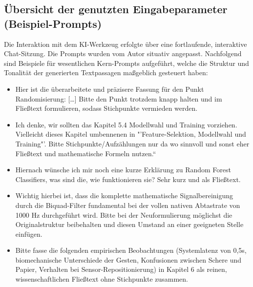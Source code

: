 \subsection*{Übersicht der genutzten Eingabeparameter (Beispiel-Prompts)}
Die Interaktion mit dem KI-Werkzeug erfolgte über eine fortlaufende, interaktive Chat-Sitzung. Die Prompts wurden vom Autor situativ angepasst. Nachfolgend sind Beispiele für wesentlichen Kern-Prompts aufgeführt, welche die Struktur und Tonalität der generierten Textpassagen maßgeblich gesteuert haben:
\begin{itemize}
    \item Hier ist die überarbeitete und präzisere Fassung für den Punkt Randomisierung: [\dots] Bitte den Punkt trotzdem knapp halten und im Fließtext formulieren, sodass Stichpunkte vermieden werden.
    \item Ich denke, wir sollten das Kapitel 5.4 Modellwahl und Training vorziehen. Vielleicht dieses Kapitel umbennenen in "'Feature-Selektion, Modellwahl und Training"'. Bitte Stichpunkte/Aufzählungen nur da wo sinnvoll und sonst eher Fließtext und mathematische Formeln nutzen.“
    \item Hiernach wünsche ich mir noch eine kurze Erklärung zu Random Forest Classifiers, was sind die, wie funktionieren sie? Sehr kurz und als Fließtext.
    \item Wichtig hierbei ist, dass die komplette mathematische Signalbereinigung durch die Biquad-Filter fundamental bei der vollen nativen Abtastrate von 1000 Hz durchgeführt wird. Bitte bei der Neuformulierung möglichst die Originalstruktur beibehalten und diesen Umstand an einer geeigneten Stelle einfügen.
    \item Bitte fasse die folgenden empirischen Beobachtungen (Systemlatenz von 0,5s, biomechanische Unterschiede der Gesten, Konfusionen zwischen Schere und Papier, Verhalten bei Sensor-Repositionierung) in Kapitel 6 als reinen, wissenschaftlichen Fließtext ohne Stichpunkte zusammen.
\end{itemize}

